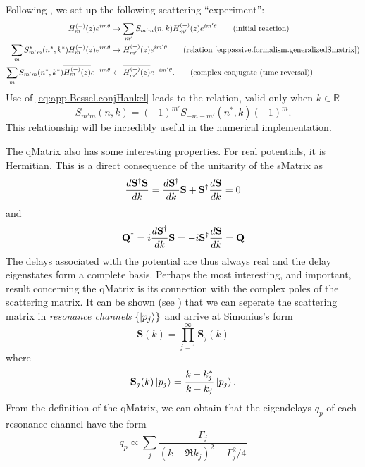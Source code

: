 Following \cite{GAP2013}, we set up the following scattering
``experiment'':
  \begin{align*}
    H_m^{(-)}(z)e^{im\theta}					&\rightarrow \sum_{m'} S_{m'm}(n,k)H_{m'}^{(+)}(z)e^{im'\theta}	\tag{initial reaction}\\
    \sum_{m}S_{m'm}^*(n^*,k^*)H_m^{(-)}(z)e^{im\theta}		&\rightarrow H_{m'}^{(+)}(z)e^{im'\theta}			\tag{relation \eqref{eq:passive.formalism.generalizedSmatrix}}\\
    \sum_{m}S_{m'm}(n^*,k^*)\overline{H_m^{(-)}(z)}e^{-im\theta}&\leftarrow \overline{H_{m'}^{(+)}(z)}e^{-im'\theta}.		\tag{complex conjugate (time reversal)}
  \end{align*}
Use of \eqref{eq:app.Bessel.conjHankel}
leads to the relation, valid only when $k\in\mathbb{R}$
  \begin{equation}
    \label{eq:passive.formalism.timeReversalSymmetryReal}
    S_{m'm}(n,k) = (-1)^{m'}S_{-m-m'}(n^*,k)(-1)^m.
  \end{equation}
This relationship will be incredibly useful in the numerical implementation.

The \gls{qMatrix} also has some interesting properties. For real
potentials, it is Hermitian. This is a direct consequence of the
unitarity of the \gls{sMatrix} as 
  \begin{equation}
   \frac{d\mathbf{S}^\dagger\mathbf{S}}{dk} = \frac{d\mathbf{S}^\dagger}{dk}\mathbf{S}+\mathbf{S}^\dagger\frac{d\mathbf{S}}{dk} = 0
  \end{equation}
and
  \begin{equation}
   \mathbf{Q}^\dagger = i\frac{d\mathbf{S}^\dagger}{dk}\mathbf{S} = -i\mathbf{S}^\dagger\frac{d\mathbf{S}}{dk} = \mathbf{Q}
  \end{equation}
The delays associated with the potential are thus always real
and the delay eigenstates form a complete basis. Perhaps the
most interesting, and important, result concerning the 
\gls{qMatrix} is its connection with the complex poles of the
scattering matrix. It can be shown (see \cite{SHI2011,SHI2012,GAP2013})
that we can seperate the scattering matrix in \textit{resonance channels} $\{\ket{p_j}\}$
and arrive at Simonius's form \cite{SIM1974}
  \begin{equation}
   \mathbf{S}(k)=\prod_{j=1}^\infty \mathbf{S}_j(k)
  \end{equation}
where
  \begin{equation}
   \mathbf{S}_j(k)\Ket{p_j} = \frac{k-k_j^*}{k-k_j}\Ket{p_j}.
  \end{equation}
From the definition of the \gls{qMatrix}, we can obtain that
the eigendelays $q_p$ of each resonance channel have the form
  \begin{equation}
   q_p \propto \sum_j \frac{\Gamma_j}{\left(k-\Re{k_j}\right)^2-\Gamma_j^2/4}
  \end{equation}

